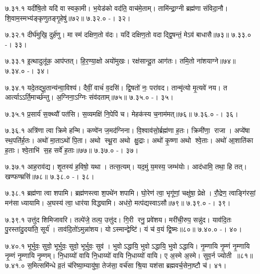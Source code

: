 ७.३१.१
यदी॑षि॒तो यदि॑ वा स्वका॒मी। भ॒येड॑को वद॑ति॒ वाच॑मे॒ताम्। तामि॑न्द्रा॒ग्नी ब्रह्म॑णा संविदा॒नौ। शि॒वाम॒स्मभ्य॑ङ्कृणुतङ्गृ॒हेषु॑॥७२॥
७.३२.०
-। ३२।
\anuvakamend

७.३२.१
दीर्घ॑मुखि॒ दुर्\mbox{}ह॑णु। मा स्म॑ दक्षिण॒तो व॑दः। यदि॑ दक्षिण॒तो वदाद्द्वि॒षन्तं॒ मेऽव॑ बाधासै॥७३॥
७.३३.०
-। ३३।
\anuvakamend

७.३३.१
इ॒त्थादुलू॑क॒ आप॑प्तत्। हि॒र॒ण्या॒क्षो अयो॑मुखः। रक्ष॑सान्दू॒त आग॑तः। तमि॒तो ना॑शयाग्ने॥७४॥
७.३४.०
-। ३४।
\anuvakamend

७.३४.१
यदे॒तद्भू॒तान्य॑न्वा॒विश्य॑। दैवीं॒ वाचं॑ व॒दसि॑। द्वि॒षतो॑ नः॒ परा॑वद। तान्मृ॑त्यो मृ॒त्यवे॑ नय। त आर्त्याऽऽर्ति॒मार्च्छ॑न्तु। अ॒ग्निना॒ऽग्निः संव॑दताम्॥७५॥
७.३५.०
-। ३५।
\anuvakamend

७.३५.१
प्र॒सार्य॑ स॒क्थ्यौ॑ पत॑सि। स॒व्यमक्षि॑ नि॒पेपि॑ च। मेहक॑स्य च॒नाम॑मत्॥७६॥
७.३६.०
-। ३६।
\anuvakamend

७.३६.१
अत्रि॑णा त्वा क्रिमे हन्मि। कण्वे॑न ज॒मद॑ग्निना। वि॒श्वाव॑सो॒र्ब्रह्म॑णा ह॒तः। क्रिमी॑णा॒ राजा। अप्ये॑षा स्थ॒पति॑र्ह॒तः। अथो॑ मा॒ताऽथो॑ पि॒ता। अथो स्थू॒रा अथो क्षु॒द्राः। अथो॑ कृ॒ष्णा अथो श्वे॒ताः। अथो॑ आ॒शाति॑का ह॒ताः। श्वे॒ताभि॑ स॒ह सर्वे॑ ह॒ताः॥७७॥
७.३७.०
-। ३७।
\anuvakamend

७.३७.१
आह॒राव॑द्य। शृ॒तस्य॑ ह॒विषो॒ यथा। तत्स॒त्यम्। यद॒मुं य॒मस्य॒ जम्भ॑योः। आद॑धामि॒ तथा॒ हि तत्। खण्फण्म्रसि॑॥७८॥
७.३८.०
-। ३८।
\anuvakamend

७.३८.१
ब्रह्म॑णा त्वा शपामि। ब्रह्म॑णस्त्वा श॒पथे॑न शपामि। घो॒रेण॑ त्वा॒ भृगू॑णां॒ चक्षु॑षा॒ प्रेक्षे। रौ॒द्रेण॒ त्वाङ्गि॑रसां॒ मन॑सा ध्यायामि। अ॒घस्य॑ त्वा॒ धार॑या विद्ध्यामि। अध॑रो॒ मत्प॑द्यस्वाऽसौ॥७९॥
७.३९.०
-। ३९।
\anuvakamend

७.३९.१
उत्तु॑द शिमिजावरि। तल्पे॑जे॒ तल्प॒ उत्तु॑द। गि॒री रनु॒ प्रवे॑शय। मरी॑ची॒रुप॒ सन्नु॑द। याव॑दि॒तः पु॒रस्ता॑दु॒दया॑ति॒ सूर्य॑। ताव॑दि॒तो॑ऽमुन्ना॑शय। योऽस्मान्द्वेष्टि॑। यं च॑ व॒यं द्वि॒ष्मः॥८०॥
७.४०.०
-। ४०।
\anuvakamend

७.४०.१
भूर्भुवः॒ सुवो॒ भूर्भुवः॒ सुवो॒ भूर्भुवः॒ सुव॑। भुवोऽद्धायि॒ भुवोऽद्धायि॒ भुवोऽद्धायि। नृ॒म्णायि नृ॒म्णं नृ॒म्णायि नृ॒म्णं नृ॒म्णायि नृ॒म्णम्। नि॒धाय्यो॑ वायि नि॒धाय्यो॑ वायि नि॒धाय्यो॑ वायि। ए अ॒स्मे अ॒स्मे। सुव॒र्न ज्योती॥८१॥
७.४१.०
स॒मित्समि॑न्धे व्र॒तं च॑रिष्या॒म्यायु॑षा॒ तेज॑सा॒ वर्च॑सा श्रि॒या यश॑सा ब्रह्मवर्च॒सेना॒ष्टौ च॑। ४१।
\anuvakamend

